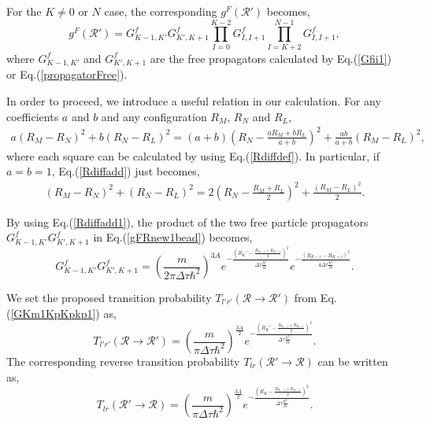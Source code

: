 \documentclass[12pt,letterpaper,UTF8]{report}
\begin{document}
For the $K \neq 0$ or $N$ case, the corresponding $g^F(\mathcal{R}')$ becomes,
\begin{equation}
g^F(\mathcal{R}') = G^f_{K-1, K'} G^f_{K', K+1} \prod_{I=0}^{K-2} G^f_{I, I+1} \prod_{I=K+2}^{N-1} G^f_{I, I+1},
\label{gFRnew1bead}
\end{equation}
where $G^f_{K-1, K'}$ and $G^f_{K', K+1}$ are the free propagators calculated by Eq.(\ref{Gfii1}) or Eq.(\ref{propagatorFree}).

In order to proceed, we introduce a useful relation in our calculation.
For any coefficients $a$ and $b$ and any configuration $R_M$, $R_N$ and $R_L$,
\begin{eqnarray}
\!\! \!\! \! a(R_M-R_N)^2\!+\!b(R_N-R_L)^2
\! = \! (a+b)
\!  \left(  R_N \!-\! \frac{aR_M\!+\!bR_L}{a\!+\!b} \right)^2
\!\! \! + \! \frac{ab}{a\!+\!b} \! \left( R_M \!-\! R_L  \right)^2, \label{Rdiffadd}
\end{eqnarray}
where each square can be calculated by using Eq.(\ref{Rdiffdef}). In particular, if $a=b=1$, Eq.(\ref{Rdiffadd}) just becomes,
\begin{eqnarray}
(R_M-R_N)^2+(R_N-R_L)^2
= 2\left(  R_N -\frac{R_M+R_L}{2} \right)^2
+ \frac{\left( R_M-R_L  \right)^2}{2} . \label{Rdiffadd1}
\end{eqnarray}

By using Eq.(\ref{Rdiffadd1}), the product of the two free particle propagators $G^f_{K-1, K'} G^f_{K', K+1}$ in Eq.(\ref{gFRnew1bead}) becomes,
\begin{equation}
G^f_{K-1, K'} G^f_{K', K+1}  =
\left( \frac{m}{2\pi \Delta \tau \hbar^2} \right)^{3A}
 e^{ -\frac{ \left({R_{K}'}-\frac{R_{K\!-\!1}+R_{K\!+\!1}}{2} \right)^2 }{ \Delta \tau  \frac{\hbar^2}{m}  } }
e^{ - \frac{ \left({R_{K\!-\!1}}-{R_{K\!+\!1}}\right)^2 }{ 4 \Delta \tau  \frac{\hbar^2}{m}  } } .
 \label{GKm1KpKpkp1}
\end{equation}

We set the proposed transition probability $T_{l'r'}(\mathcal{R} \rightarrow \mathcal{R}')$ from Eq.(\ref{GKm1KpKpkp1}) as,
\begin{equation}
T_{l'r'}(\mathcal{R} \rightarrow \mathcal{R}') =
\left( \frac{m}{\pi \Delta \tau \hbar^2} \right)^{\frac{3A}{2}}
 e^{  -\frac{ \left({R_{K}'}-\frac{R_{K\!-\!1}+R_{K\!+\!1}}{2} \right)^2 }{ \Delta \tau  \frac{\hbar^2}{m}  }} .
 \label{Tlrnew}
\end{equation}
The corresponding reverse transition probability $T_{lr}(\mathcal{R}' \rightarrow \mathcal{R})$ can be written as,
\begin{equation}
T_{lr}(\mathcal{R}' \rightarrow \mathcal{R}) =
\left( \frac{m}{\pi \Delta \tau \hbar^2} \right)^{\frac{3A}{2}}
 e^{  -\frac{ \left({R_{K}}-\frac{R_{K\!-\!1}+R_{K\!+\!1}}{2} \right)^2 }{ \Delta \tau  \frac{\hbar^2}{m}  }} .
 \label{Tlrold}
\end{equation}
\end{document}
